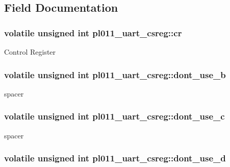 \subsection{Field Documentation}
\hypertarget{structpl011__uart__csreg_a28704fd0e3afa5f16b1d337a3d86f40b}{
\subsubsection[{cr}]{\setlength{\rightskip}{0pt plus 5cm}volatile unsigned int pl011\-\_\-uart\-\_\-csreg\-::cr}}\label{structpl011__uart__csreg_a28704fd0e3afa5f16b1d337a3d86f40b}
Control Register \hypertarget{structpl011__uart__csreg_aa55af5642e87a291a7fcdbf78a4622a9}{
\subsubsection[{dont\-\_\-use\-\_\-b}]{\setlength{\rightskip}{0pt plus 5cm}volatile unsigned int pl011\-\_\-uart\-\_\-csreg\-::dont\-\_\-use\-\_\-b}}\label{structpl011__uart__csreg_aa55af5642e87a291a7fcdbf78a4622a9}
spacer \hypertarget{structpl011__uart__csreg_ae1386f62227dd11aabd9706a6def488f}{
\subsubsection[{dont\-\_\-use\-\_\-c}]{\setlength{\rightskip}{0pt plus 5cm}volatile unsigned int pl011\-\_\-uart\-\_\-csreg\-::dont\-\_\-use\-\_\-c}}\label{structpl011__uart__csreg_ae1386f62227dd11aabd9706a6def488f}
spacer \hypertarget{structpl011__uart__csreg_a32675cf6ee70fbe72947432343edf1d9}{
\subsubsection[{dont\-\_\-use\-\_\-d}]{\setlength{\rightskip}{0pt plus 5cm}volatile unsigned int pl011\-\_\-uart\-\_\-csreg\-::dont\-\_\-use\-\_\-d}}\label{structpl011__uart__csreg_a32675cf6ee70fbe72947432343edf1d9}
